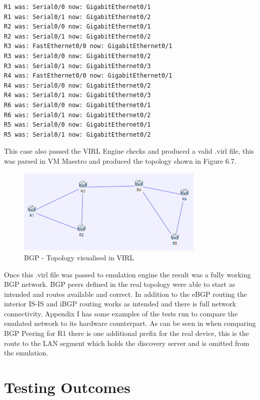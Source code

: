 \documentclass[11pt]{report}
\begin{document}
\begin{lstlisting}[caption=Interface mappings for BGP topology]
R1 was: Serial0/0 now: GigabitEthernet0/1
R1 was: Serial0/1 now: GigabitEthernet0/2
R2 was: Serial0/0 now: GigabitEthernet0/1
R2 was: Serial0/1 now: GigabitEthernet0/2
R3 was: FastEthernet0/0 now: GigabitEthernet0/1
R3 was: Serial0/0 now: GigabitEthernet0/2
R3 was: Serial0/1 now: GigabitEthernet0/3
R4 was: FastEthernet0/0 now: GigabitEthernet0/1
R4 was: Serial0/0 now: GigabitEthernet0/2
R4 was: Serial0/1 now: GigabitEthernet0/3
R6 was: Serial0/0 now: GigabitEthernet0/1
R6 was: Serial0/1 now: GigabitEthernet0/2
R5 was: Serial0/0 now: GigabitEthernet0/1
R5 was: Serial0/1 now: GigabitEthernet0/2
\end{lstlisting}

This case also passed the VIRL Engine checks and produced a valid .virl file, this was parsed in VM Maestro and produced the topology shown in Figure 6.7.

\FloatBarrier
\begin{figure}[h!]
	\caption{BGP - Topology visualised in VIRL}
	\centering
	\begin{center}
		\includegraphics[width=0.8\textwidth]{BGP-VIRL.png}
	\end{center}
\end{figure}
\FloatBarrier

Once this .virl file was passed to emulation engine the result was a fully working BGP network. BGP peers defined in the real topology were able to start as intended and routes available and correct. In addition to the eBGP routing the interior IS-IS and iBGP routing works as intended and there is full network connectivity. Appendix I has some examples of the tests run to compare the emulated network to its hardware counterpart. As can be seen in when comparing BGP Peering for R1 there is one additional prefix for the real device, this is the route to the LAN segment which holds the discovery server and is omitted from the emulation.

\section{Testing Outcomes}
\end{document}
